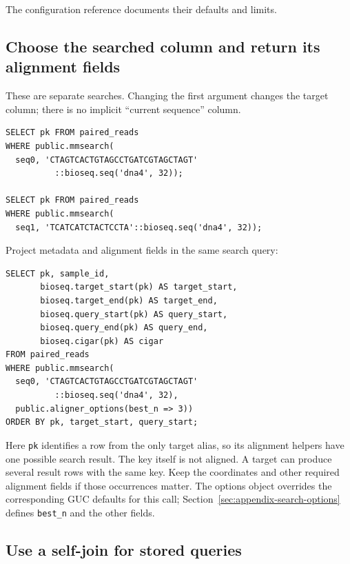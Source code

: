 The configuration reference documents their defaults and limits.

\subsection{Choose the searched column and return its alignment fields}

These are separate searches. Changing the first argument changes the target
column; there is no implicit ``current sequence'' column.

\par\noindent\begin{minipage}{\linewidth}
\begin{lstlisting}[style=bioseq-appendix-sql]
SELECT pk FROM paired_reads
WHERE public.mmsearch(
  seq0, 'CTAGTCACTGTAGCCTGATCGTAGCTAGT'
          ::bioseq.seq('dna4', 32));

SELECT pk FROM paired_reads
WHERE public.mmsearch(
  seq1, 'TCATCATCTACTCCTA'::bioseq.seq('dna4', 32));
\end{lstlisting}
\end{minipage}

Project metadata and alignment fields in the same search query:

\par\noindent\begin{minipage}{\linewidth}
\begin{lstlisting}[style=bioseq-appendix-sql]
SELECT pk, sample_id,
       bioseq.target_start(pk) AS target_start,
       bioseq.target_end(pk) AS target_end,
       bioseq.query_start(pk) AS query_start,
       bioseq.query_end(pk) AS query_end,
       bioseq.cigar(pk) AS cigar
FROM paired_reads
WHERE public.mmsearch(
  seq0, 'CTAGTCACTGTAGCCTGATCGTAGCTAGT'
          ::bioseq.seq('dna4', 32),
  public.aligner_options(best_n => 3))
ORDER BY pk, target_start, query_start;
\end{lstlisting}
\end{minipage}

Here \texttt{pk} identifies a row from the only target alias, so its
alignment helpers have one possible search result. The key itself is not
aligned. A target can produce several result rows with the same key. Keep
the coordinates and other required alignment fields if those occurrences
matter. The options object overrides the corresponding GUC defaults for
this call; Section~\ref{sec:appendix-search-options} defines
\texttt{best\_n} and the other fields.

\subsection{Use a self-join for stored queries}

